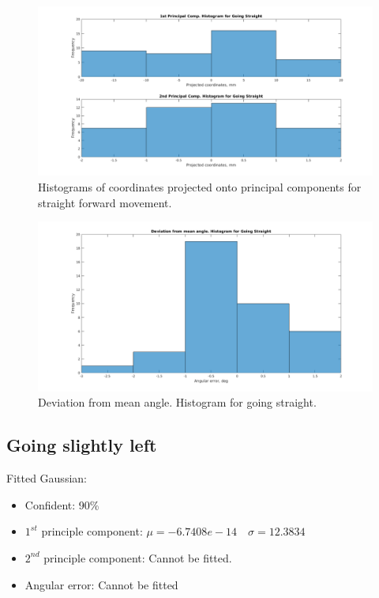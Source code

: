 \documentclass[paper=a4, fontsize=11pt]{scrartcl} %
\begin{document}
    \begin{figure}[H]
        \begin{center}
            \setlength{\fboxsep}{0.5pt} %
            \setlength{\fboxrule}{0.5pt}
            \includegraphics[width=\linewidth,fbox]{images/pca_histogram_straight.png}
            \caption{Histograms of coordinates projected onto principal components for straight forward movement.}
        \end{center}
    \end{figure}
    \begin{figure}[H]
        \begin{center}
            \setlength{\fboxsep}{0.5pt} %
            \setlength{\fboxrule}{0.5pt}
            \includegraphics[width=\linewidth,fbox]{images/histogram_1_phi_straight.png}
            \caption{Deviation from mean angle. Histogram for going straight.}
        \end{center}
    \end{figure}
	
    \newpage
    \subsection{Going slightly left}
    Fitted Gaussian:
    \begin{itemize}
    	\item Confident: 90\%
	    \item $1^{st}$ principle component: $\mu = -6.7408e-14 \quad \sigma = 12.3834$
	    \item $2^{nd}$ principle component: Cannot be fitted.
	    \item Angular error: Cannot be fitted
    \end{itemize}
    
\end{document}
